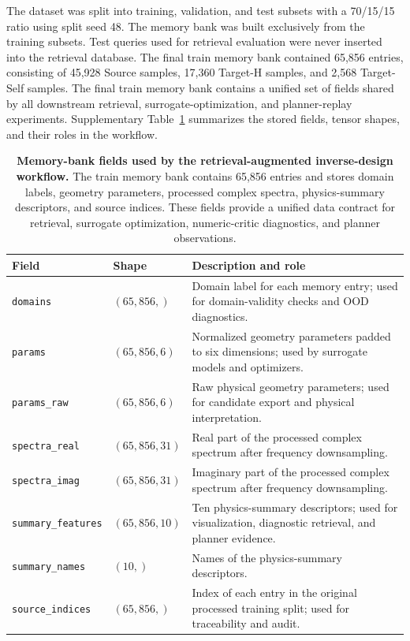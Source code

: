 \documentclass[final,1p,times]{elsarticle}
\begin{document}
The dataset was split into training, validation, and test subsets with a 70/15/15 ratio using split seed 48. The memory bank was built exclusively from the training subsets. Test queries used for retrieval evaluation were never inserted into the retrieval database. The final train memory bank contained 65,856 entries, consisting of 45,928 Source samples, 17,360 Target-H samples, and 2,568 Target-Self samples.
The final train memory bank contains a unified set of fields shared by all downstream retrieval, surrogate-optimization, and planner-replay experiments. Supplementary Table~\ref{tab:si_memory_bank_fields} summarizes the stored fields, tensor shapes, and their roles in the workflow.

\begin{table}[htbp!]
\centering
\caption{\textbf{Memory-bank fields used by the retrieval-augmented inverse-design workflow.}
The train memory bank contains 65,856 entries and stores domain labels, geometry parameters, processed complex spectra, physics-summary descriptors, and source indices. These fields provide a unified data contract for retrieval, surrogate optimization, numeric-critic diagnostics, and planner observations.}
\label{tab:si_memory_bank_fields}
\footnotesize
\setlength{\tabcolsep}{4.5pt}
\renewcommand{\arraystretch}{1.15}
\begin{tabular}{lll}
\toprule
Field & Shape & Description and role \\
\midrule
\texttt{domains} & $(65{,}856,)$ &
Domain label for each memory entry; used for domain-validity checks and OOD diagnostics. \\
\texttt{params} & $(65{,}856, 6)$ &
Normalized geometry parameters padded to six dimensions; used by surrogate models and optimizers. \\
\texttt{params\_raw} & $(65{,}856, 6)$ &
Raw physical geometry parameters; used for candidate export and physical interpretation. \\
\texttt{spectra\_real} & $(65{,}856, 31)$ &
Real part of the processed complex spectrum after frequency downsampling. \\
\texttt{spectra\_imag} & $(65{,}856, 31)$ &
Imaginary part of the processed complex spectrum after frequency downsampling. \\
\texttt{summary\_features} & $(65{,}856, 10)$ &
Ten physics-summary descriptors; used for visualization, diagnostic retrieval, and planner evidence. \\
\texttt{summary\_names} & $(10,)$ &
Names of the physics-summary descriptors. \\
\texttt{source\_indices} & $(65{,}856,)$ &
Index of each entry in the original processed training split; used for traceability and audit. \\
\bottomrule
\end{tabular}
\end{table}
\end{document}

